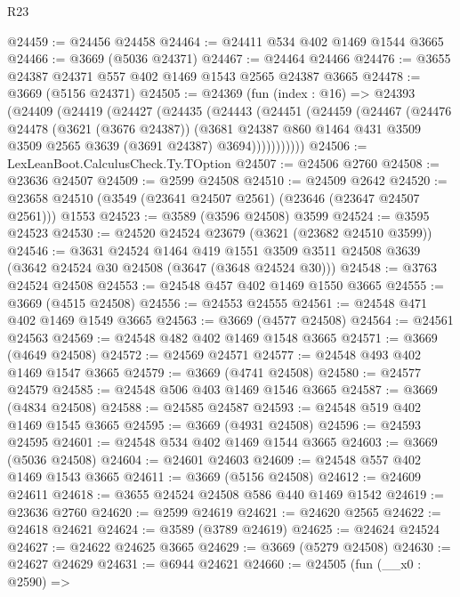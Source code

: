 \begin{lexlean}{R23}
\begin{coremodule}
@24459 := @24456 @24458
@24464 := @24411 @534 @402 @1469 @1544 @3665
@24466 := @3669 (@5036 @24371)
@24467 := @24464 @24466
@24476 := @3655 @24387 @24371 @557 @402 @1469 @1543 @2565 @24387 @3665
@24478 := @3669 (@5156 @24371)
@24505 := @24369
    (fun (index : @16) =>
    @24393
      (@24409
        (@24419
          (@24427
            (@24435
              (@24443
                (@24451
                  (@24459
                    (@24467
                      (@24476
                        @24478
                        (@3621 (@3676 @24387))
                        (@3681
                          @24387
                          @860
                          @1464
                          @431
                          @3509
                          @3509
                          @2565
                          @3639
                          (@3691 @24387)
                          @3694)))))))))))
@24506 := LexLeanBoot.CalculusCheck.Ty.TOption
@24507 := @24506 @2760
@24508 := @23636 @24507
@24509 := @2599 @24508
@24510 := @24509 @2642
@24520 := @23658 @24510 (@3549 (@23641 @24507 @2561) (@23646 (@23647 @24507 @2561))) @1553
@24523 := @3589 (@3596 @24508) @3599
@24524 := @3595 @24523
@24530 := @24520 @24524 @23679 (@3621 (@23682 @24510 @3599))
@24546 := @3631
    @24524
    @1464
    @419
    @1551
    @3509
    @3511
    @24508
    @3639
    (@3642 @24524 @30 @24508 (@3647 (@3648 @24524 @30)))
@24548 := @3763 @24524 @24508
@24553 := @24548 @457 @402 @1469 @1550 @3665
@24555 := @3669 (@4515 @24508)
@24556 := @24553 @24555
@24561 := @24548 @471 @402 @1469 @1549 @3665
@24563 := @3669 (@4577 @24508)
@24564 := @24561 @24563
@24569 := @24548 @482 @402 @1469 @1548 @3665
@24571 := @3669 (@4649 @24508)
@24572 := @24569 @24571
@24577 := @24548 @493 @402 @1469 @1547 @3665
@24579 := @3669 (@4741 @24508)
@24580 := @24577 @24579
@24585 := @24548 @506 @403 @1469 @1546 @3665
@24587 := @3669 (@4834 @24508)
@24588 := @24585 @24587
@24593 := @24548 @519 @402 @1469 @1545 @3665
@24595 := @3669 (@4931 @24508)
@24596 := @24593 @24595
@24601 := @24548 @534 @402 @1469 @1544 @3665
@24603 := @3669 (@5036 @24508)
@24604 := @24601 @24603
@24609 := @24548 @557 @402 @1469 @1543 @3665
@24611 := @3669 (@5156 @24508)
@24612 := @24609 @24611
@24618 := @3655 @24524 @24508 @586 @440 @1469 @1542
@24619 := @23636 @2760
@24620 := @2599 @24619
@24621 := @24620 @2565
@24622 := @24618 @24621
@24624 := @3589 (@3789 @24619)
@24625 := @24624 @24524
@24627 := @24622 @24625 @3665
@24629 := @3669 (@5279 @24508)
@24630 := @24627 @24629
@24631 := @6944 @24621
@24660 := @24505
    (fun (__x0 : @2590) =>

\end{coremodule}
\end{lexlean}
